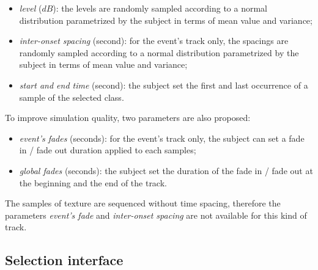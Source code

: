 \documentclass[preprint,12pt]{elsarticle}
\begin{document}
\begin{itemize}
\item \emph{level} ($dB$): the levels are  randomly sampled according to a normal distribution parametrized by the subject in terms of mean value and variance;
\item \emph{inter-onset spacing} (second): for the event's track only, the spacings are randomly sampled according to a normal distribution parametrized by the subject in terms of mean value and variance;
\item \emph{start and end time} (second): the subject set the first and last occurrence of a sample of the selected class.
\end{itemize}


To improve simulation quality, two parameters are also proposed:


\begin{itemize}
\item \emph{event's fades} (seconds): for the event's track only, the subject can set a fade in / fade out duration applied to each samples;
\item \emph{global fades} (seconds): the subject set the duration of the fade in / fade out at the beginning and the end of the track.
\end{itemize}


The samples of texture are sequenced without time spacing, therefore the parameters \emph{event's fade} and \emph{inter-onset spacing} are not available for this kind of track.

\subsection{Selection interface}
\label{sec:simscene_ssf}
\end{document}
